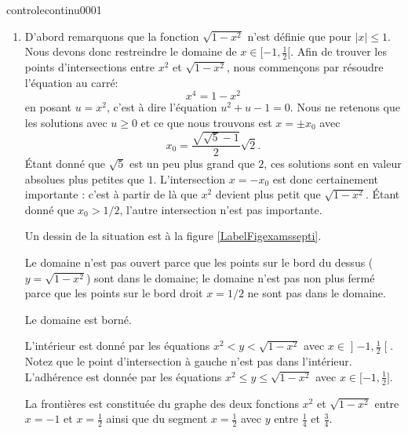 \begin{corrige}{controlecontinu0001}


\begin{enumerate}
    \item
        D'abord remarquons que la fonction \( \sqrt{1-x^2}\) n'est définie que pour \( | x |\leq 1\). Nous devons donc restreindre le domaine de \( x\in\mathopen[ -1 , \frac{ 1 }{2} [\). Afin de trouver les points d'intersections entre \( x^2\) et \( \sqrt{1-x^2}\), nous commençons par résoudre l'équation au carré:
        \begin{equation}
            x^4=1-x^2
        \end{equation}
        en posant \( u=x^2\), c'est à dire l'équation \( u^2+u-1=0\). Nous ne retenons que les solutions avec \( u\geq 0\) et ce que nous trouvons est \( x=\pm x_0\) avec
        \begin{equation}
            x_0=\frac{ \sqrt{\sqrt{5}-1} }{ 2 }\sqrt{2}.
        \end{equation}
        Étant donné que \( \sqrt{5}\) est un peu plus grand que \( 2\), ces solutions sont en valeur absolues plus petites que \( 1\). L'intersection \( x=-x_0\) est donc certainement importante : c'est à partir de là que \( x^2\) devient plus petit que \( \sqrt{1-x^2}\). Étant donné que \( x_0>1/2\), l'autre intersection n'est pas importante.
    
        Un dessin de la situation est à la figure \ref{LabelFigexamssepti}.
        \newcommand{\CaptionFigexamssepti}{Pour l'exercice \ref{exocontrolecontinu0001}}
        

        Le domaine n'est pas ouvert parce que les points sur le bord du dessus (\( y=\sqrt{1-x^2}\)) sont dans le domaine; le domaine n'est pas non plus fermé parce que les points sur le bord droit \( x=1/2\) ne sont pas dans le domaine.

        Le domaine est borné.

        L'intérieur est donné par les équations \( x^2<y<\sqrt{1-x^2}\) avec \( x\in\mathopen] -1 , \frac{ 1 }{2} \mathclose[\). Notez que le point d'intersection à gauche n'est pas dans l'intérieur. L'adhérence est donnée par les équations \( x^2\leq y\leq\sqrt{1-x^2}\) avec \( x\in\mathopen[ -1 , \frac{ 1 }{2} \mathclose]\).

        La frontières est constituée du graphe des deux fonctions \( x^2\) et \( \sqrt{1-x^2}\) entre \( x=-1\) et \( x=\frac{ 1 }{2}\) ainsi que du segment \( x=\frac{ 1 }{2}\) avec \( y\) entre \( \frac{1}{ 4 }\) et \( \frac{ 3 }{ 4 }\).


\end{enumerate}
\end{corrige}
